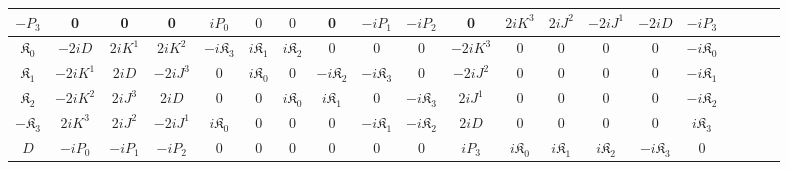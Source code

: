 \documentclass[aps,reprint,notitlepage,nofootinbib,superscriptaddress]{revtex4-1}
\begin{document}
\begin{widetext}
\begin{center}
\begin{table}[h!]
{\begin{tabular}{ |c||c|c|c|c|c|c|c|c|c|c|c|c|c|c|c|c|c|c|c| }
 \rule{0pt}{16pt}$-P_{{3}}$ &0&0&0&${iP_{{0}}}$&$0$&$0$&0&${-iP_{{1}}}$&${-iP_{{2}}}$&0&$2iK^{{3}}$&${2i{J}^{{2}}}$&${-2i{J}^{{1}}}$&$-2iD$&$-iP_{{3}}$\\
 \hline 
 \rule{0pt}{16pt}$\mathfrak{K}_{{0}}$ &$-2iD$&$2i{K}^{{1}}$&$2i{K}^{{2}}$&${-i\mathfrak{K}_{{3}}}$&$i\mathfrak{K}_{{1}}$&$i\mathfrak{K}_{{2}}$&0&$0$&$0$&$-2iK^{{3}}$&0&0&0&0&$-i\mathfrak{K}_{{0}}$\\
 \hline
 \rule{0pt}{16pt}$\mathfrak{K}_{{1}}$ &$-2i{K}^{{1}}$&$2iD$&$-2iJ^{{3}}$&0&$i\mathfrak{K}_{{0}}$&0&$-i\mathfrak{K}_{{2}}$&${-i\mathfrak{K}_{{3}}}$&0&${-2i{J}^{{2}}}$&0&0&0&0&$-i\mathfrak{K}_{{1}}$\\
 \hline 
 \rule{0pt}{16pt}$\mathfrak{K}_{{2}}$ &$-2i{K}^{{2}}$&$2iJ^{{3}}$&$2iD$&0&0&$i\mathfrak{K}_{{0}}$&$i\mathfrak{K}_{{1}}$&0&${-i\mathfrak{K}_{{3}}}$&${2i{J}^{{1}}}$&0&0&0&0&$-i\mathfrak{K}_{{2}}$\\
 \hline 
 \rule{0pt}{16pt}$-\mathfrak{K}_{{3}}$ &${2iK^{{3}}}$&${2i{J}^{{2}}}$&${-2i{J}^{{1}}}$&${i\mathfrak{K}_{{0}}}$&$0$&$0$&0&${-i\mathfrak{K}_{{1}}}$&${-i\mathfrak{K}_{{2}}}$&$2iD$&0&0&0&0&$i\mathfrak{K}_{{3}}$\\
 \hline 
 \rule{0pt}{16pt}$D$ &$-iP_{{0}}$&$-iP_{{1}}$&$-iP_{{2}}$&0&0&0&0&0&0&$iP_{{3}}$&$i\mathfrak{K}_{{0}}$&$i\mathfrak{K}_{{1}}$&$i\mathfrak{K}_{{2}}$&$-i\mathfrak{K}_{{3}}$&0\\
 \hline
\end{tabular}}
\end{table}
\end{center}
\end{widetext}
\end{document}
